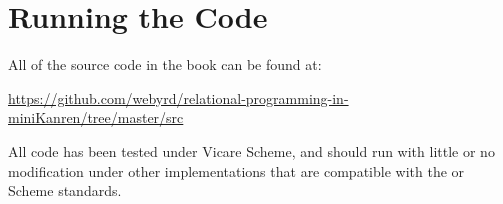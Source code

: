 














\section{Running the Code}\label{sec:preface:code}

All of the source code in the book can be found at:

\begin{fullwidth}
\noindent
\url{https://github.com/webyrd/relational-programming-in-miniKanren/tree/master/src}
\end{fullwidth}


\noindent 
All code has been tested under Vicare Scheme, and should run with little or no modification under other implementations that are compatible with the \RfiveRSsp or \RsixRSsp{} Scheme standards.




